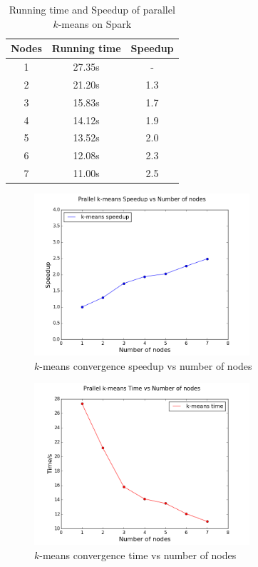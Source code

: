 \documentclass{acm_proc_article-sp}
\begin{document}
\begin{table}[htb]
\centering
\begin{tabular}{|c|c|c|}
\hline
Nodes & Running time & Speedup \\
\hline
 1 & 27.35s & - \\
 2 & 21.20s & 1.3\\
 3 & 15.83s & 1.7 \\
 4 & 14.12s & 1.9\\
 5 & 13.52s & 2.0\\
 6 & 12.08s & 2.3\\
 7 & 11.00s & 2.5\\
 \hline
\end{tabular}
\caption{Running time and Speedup of parallel $k$-means on Spark}
\label{table_kmeans}
\end{table}

\begin{figure}[htb]
\centering
\includegraphics[height=6cm]{ks.png}
\caption{$k$-means convergence speedup vs number of nodes}
\label{km_speedup}
\end{figure}

\begin{figure}[htb]
\centering
\includegraphics[height=6cm]{kt.png}
\caption{$k$-means convergence time vs number of nodes}
\label{km_time}
\end{figure}
\end{document}
